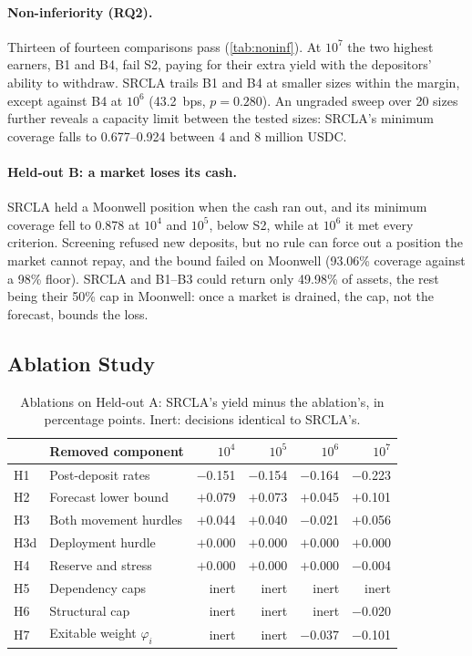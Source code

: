 \documentclass[sigconf]{acmart}
\begin{document}
\paragraph{Non-inferiority (RQ2).}
Thirteen of fourteen comparisons pass (\cref{tab:noninf}). At $10^7$ the two highest earners, B1 and B4, fail S2, paying for their extra yield with the depositors' ability to withdraw. SRCLA trails B1 and B4 at smaller sizes within the margin, except against B4 at $10^6$ (43.2~bps, $p = 0.280$). An ungraded sweep over 20 sizes further reveals a capacity limit between the tested sizes: SRCLA's minimum coverage falls to 0.677--0.924 between 4 and 8 million USDC.

\paragraph{Held-out B: a market loses its cash.}
SRCLA held a Moonwell position when the cash ran out, and its minimum coverage fell to 0.878 at $10^4$ and $10^5$, below S2, while at $10^6$ it met every criterion. Screening refused new deposits, but no rule can force out a position the market cannot repay, and the bound failed on Moonwell (93.06\% coverage against a 98\% floor). SRCLA and B1--B3 could return only 49.98\% of assets, the rest being their 50\% cap in Moonwell: once a market is drained, the cap, not the forecast, bounds the loss.

\subsection{Ablation Study}
\label{sec:ablation}

\begin{table}[t]
\caption{Ablations on Held-out A: SRCLA's yield minus the ablation's, in percentage points. Inert: decisions identical to SRCLA's.}
\label{tab:ablations}
\centering
\small
\setlength{\tabcolsep}{2.5pt}
\begin{tabular}{llrrrr}
\toprule
 & Removed component & $10^4$ & $10^5$ & $10^6$ & $10^7$ \\
\midrule
H1  & Post-deposit rates      & $-$0.151 & $-$0.154 & $-$0.164 & $-$0.223 \\
H2  & Forecast lower bound    & $+$0.079 & $+$0.073 & $+$0.045 & $+$0.101 \\
H3  & Both movement hurdles   & $+$0.044 & $+$0.040 & $-$0.021 & $+$0.056 \\
H3d & Deployment hurdle       & $+$0.000 & $+$0.000 & $+$0.000 & $+$0.000 \\
H4  & Reserve and stress      & $+$0.000 & $+$0.000 & $+$0.000 & $-$0.004 \\
H5  & Dependency caps         & inert & inert & inert & inert \\
H6  & Structural cap          & inert & inert & inert & $-$0.020 \\
H7  & Exitable weight $\varphi_i$ & inert & inert & $-$0.037 & $-$0.101 \\
\bottomrule
\end{tabular}
\end{table}
\end{document}
